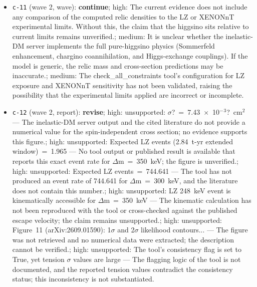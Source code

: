 \documentclass[11pt,a4paper]{article}
\begin{document}
\begin{itemize}
  \item \texttt{c-11} (wave 2, wave): \textbf{continue}; high: The current evidence does not include any comparison of the computed relic densities to the LZ or XENONnT experimental limits. Without this, the claim that the higgsino sits relative to current limits remains unverified.; medium: It is unclear whether the inelastic-DM server implements the full pure-higgsino physics (Sommerfeld enhancement, chargino coannihilation, and Higgs-exchange couplings). If the model is generic, the relic mass and cross-section predictions may be inaccurate.; medium: The check\_all\_constraints tool's configuration for LZ exposure and XENONnT sensitivity has not been validated, raising the possibility that the experimental limits applied are incorrect or incomplete.
  \item \texttt{c-12} (wave 2, report): \textbf{revise}; high: unsupported: $\sigma$?~=~7.43~$\times$~10$^-$$^3$?~cm$^2$ --- The inelastic-DM server output and the cited literature do not provide a numerical value for the spin-independent cross section; no evidence supports this figure.; high: unsupported: Expected LZ events (2.84~t-yr extended window)~=~1.965 --- No tool output or published result is available that reports this exact event rate for $\Delta$m~=~350~keV; the figure is unverified.; high: unsupported: Expected LZ events~=~744.641 --- The tool has not produced an event rate of 744.641 for $\Delta$m~=~300~keV, and the literature does not contain this number.; high: unsupported: LZ 248~keV event is kinematically accessible for $\Delta$m~=~350~keV --- The kinematic calculation has not been reproduced with the tool or cross-checked against the published escape velocity; the claim remains unsupported.; high: unsupported: Figure~11 (arXiv:2609.01590): 1$\sigma$ and 2$\sigma$ likelihood contours... --- The figure was not retrieved and no numerical data were extracted; the description cannot be verified.; high: unsupported: The tool's consistency flag is set to True, yet tension $\sigma$ values are large --- The flagging logic of the tool is not documented, and the reported tension values contradict the consistency status; this inconsistency is not substantiated.
\end{itemize}
\end{document}
